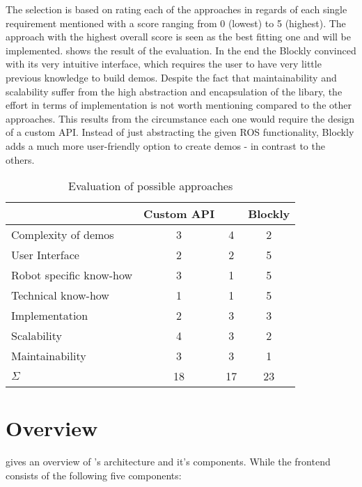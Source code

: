 The selection is based on rating each of the approaches in regards of each single requirement mentioned with a score ranging from 0 (lowest) to 5 (highest). The approach with the highest overall score is seen as the best fitting one and will be implemented.  shows the result of the evaluation. In the end the Blockly convinced with its very intuitive interface, which requires the user to have very little previous knowledge to build demos. Despite the fact that maintainability and scalability suffer from the high abstraction and encapsulation of the libary, the effort in terms of implementation is not worth mentioning compared to the other approaches. This results from the circumstance each one would require the design of a custom API. Instead of just abstracting the given ROS functionality, Blockly adds a much more user-friendly option to create demos - in contrast to the others.

\begin{table}[htbp]
	\centering
	\begin{tabular}{l c c c}
		\toprule
		                        & Custom API & \smach{} & Blockly \\
		\midrule
		Complexity of demos     & 3          & 4        & 2       \\
		User Interface          & 2          & 2        & 5       \\
		Robot specific know-how & 3          & 1        & 5       \\
		Technical know-how      & 1          & 1        & 5       \\
		Implementation          & 2          & 3        & 3       \\
		Scalability             & 4          & 3        & 2       \\
		Maintainability         & 3          & 3        & 1       \\
		\bottomrule
		$\Sigma$                & 18         & 17       & 23      \\
		\bottomrule
	\end{tabular}
	\caption{Evaluation of possible approaches}
	\label{tab:decision}
\end{table}

\section{Overview}
 gives an overview of \toolname{}'s architecture and it's components. While the frontend consists of the following five components:

